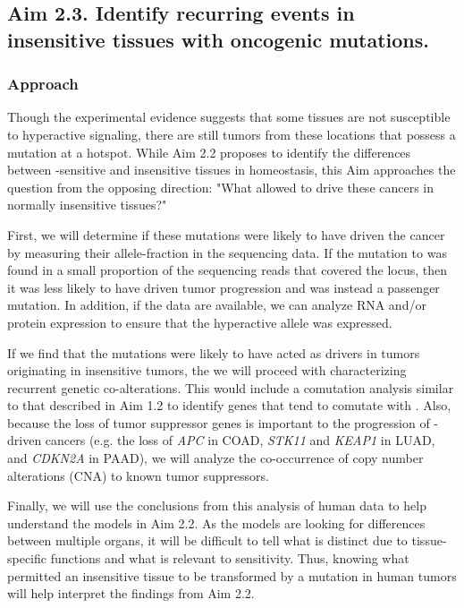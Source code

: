 
\subsection*{Aim 2.3. Identify recurring events in insensitive tissues with oncogenic \KRAS{} mutations.}

\subsubsection*{Approach}

Though the experimental evidence suggests that some tissues are not susceptible to hyperactive \kras{} signaling, there are still tumors from these locations that possess a mutation at a \KRAS{} hotspot.
While Aim 2.2 proposes to identify the differences between \KRAS{}-sensitive and insensitive tissues in homeostasis, this Aim approaches the question from the opposing direction: "What allowed \KRAS{} to drive these cancers in normally insensitive tissues?"

First, we will determine if these mutations were likely to have driven the cancer by measuring their allele-fraction in the sequencing data.
If the mutation to \KRAS{} was found in a small proportion of the sequencing reads that covered the \KRAS{} locus, then it was less likely to have driven tumor progression and was instead a passenger mutation.
In addition, if the data are available, we can analyze RNA and/or protein expression to ensure that the hyperactive allele was expressed.

If we find that the \KRAS{} mutations were likely to have acted as drivers in tumors originating in insensitive tumors, the we will proceed with characterizing recurrent genetic co-alterations.
This would include a comutation analysis similar to that described in Aim 1.2 to identify genes that tend to comutate with \KRAS{}.
Also, because the loss of tumor suppressor genes is important to the progression of \KRAS{}-driven cancers (e.g. the loss of \emph{APC} in COAD, \emph{STK11} and \emph{KEAP1} in LUAD, and \emph{CDKN2A} in PAAD), we will analyze the co-occurrence of copy number alterations (CNA) to known tumor suppressors.

Finally, we will use the conclusions from this analysis of human data to help understand the models in Aim 2.2.
As the models are looking for differences between multiple organs, it will be difficult to tell what is distinct due to tissue-specific functions and what is relevant to \KRAS{} sensitivity.
Thus, knowing what permitted an insensitive tissue to be transformed by a \KRAS{} mutation in human tumors will help interpret the findings from Aim 2.2.

